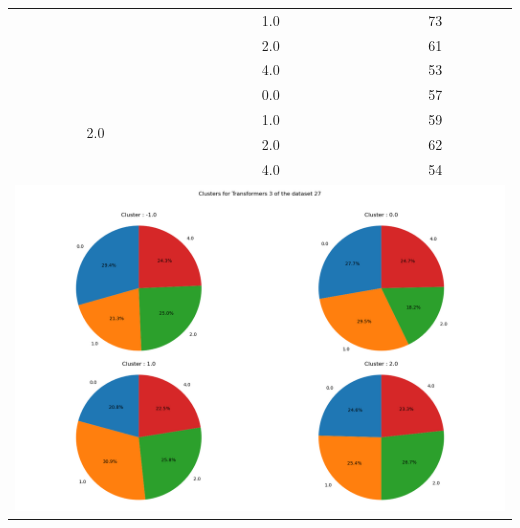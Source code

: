 \begin{longtable}{|c|c|c|c|c|}
& \multicolumn{2}{c|}{1.0} & \multicolumn{2}{c|}{73} \\
& \multicolumn{2}{c|}{2.0} & \multicolumn{2}{c|}{61} \\
& \multicolumn{2}{c|}{4.0} & \multicolumn{2}{c|}{53} \\
\hline
\multirow{4}{*}{2.0} & \multicolumn{2}{c|}{0.0} & \multicolumn{2}{c|}{57} \\
& \multicolumn{2}{c|}{1.0} & \multicolumn{2}{c|}{59} \\
& \multicolumn{2}{c|}{2.0} & \multicolumn{2}{c|}{62} \\
& \multicolumn{2}{c|}{4.0} & \multicolumn{2}{c|}{54} \\
\hline
\multicolumn{5}{|c|}{\includegraphics[width=0.8\linewidth]{img/annexes/27/clustering_pie_charts/Transformers 3.png}} \\
\end{longtable}



